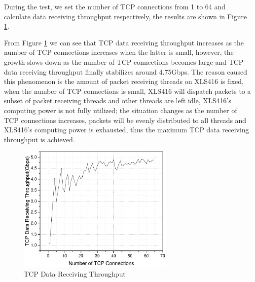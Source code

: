 \documentclass[conference]{IEEEtran}
\begin{document}
During the test, we set the number of TCP connections from 1 to 64 and calculate data receiving throughput respectively, the results are shown in Figure \ref{result}.

From Figure \ref{result} we can see that TCP data receiving throughput increases as the number of TCP connections increases when the latter is small, however, the growth slows down as the number of TCP connections becomes large and TCP data receiving throughput finally stabilizes around 4.75Gbps. The reason caused this phenomenon is the amount of packet receiving threads on XLS416 is fixed, when the number of TCP connections is small, XLS416 will dispatch packets to a subset of packet receiving threads and other threads are left idle, XLS416's computing power is not fully utilized; the situation changes as the number of TCP connections increases, packets will be evenly distributed to all threads and XLS416's computing power is exhausted, thus the maximum TCP data receiving throughput is achieved.
\begin{figure}[!t]
\centering
\includegraphics[width=3.0in]{oldresult}
\caption{TCP Data Receiving Throughput}
\label{result}
\end{figure}
\end{document}
